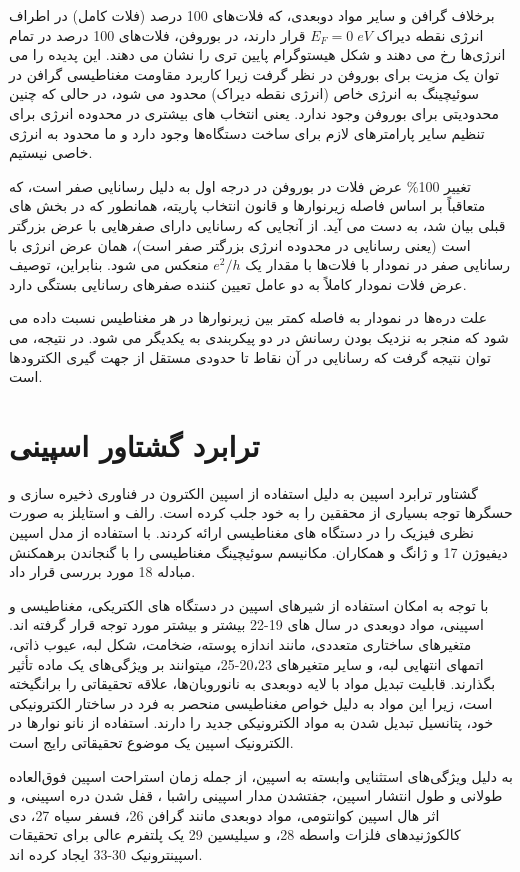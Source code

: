 برخلاف گرافن و سایر مواد دوبعدی، که فلات‌های 100 درصد (فلات کامل) در اطراف انرژی نقطه دیراک $E_F = 0\; eV$ قرار دارند، در بوروفن، فلات‌های 100 درصد در تمام انرژی‌ها رخ می دهند و شکل هیستوگرام پایین تری را نشان می دهند. این پدیده را می توان یک مزیت برای بوروفن در نظر گرفت زیرا کاربرد مقاومت مغناطیسی گرافن در سوئیچینگ به انرژی خاص (انرژی نقطه دیراک) محدود می شود، در حالی که چنین محدودیتی برای بوروفن وجود ندارد. یعنی انتخاب های بیشتری در محدوده انرژی برای تنظیم سایر پارامترهای لازم برای ساخت دستگاه‌ها وجود دارد و ما محدود به انرژی خاصی نیستیم.

تغییر 100\% عرض فلات در بوروفن در درجه اول به دلیل رسانایی  صفر است، که متعاقباً بر اساس فاصله زیر‌نوارها و قانون انتخاب پاریته، همانطور که در بخش های قبلی بیان شد، به دست می آید. از آنجایی که رسانایی دارای صفرهایی با عرض بزرگتر است (یعنی رسانایی در محدوده انرژی بزرگتر صفر است)، همان عرض انرژی با رسانایی صفر در نمودار  با فلات‌ها با مقدار یک $e^2/h$ منعکس می شود. بنابراین، توصیف عرض فلات نمودار  کاملاً به دو عامل تعیین کننده صفرهای رسانایی بستگی دارد. 

علت دره‌ها در نمودار  به فاصله کمتر بین زیر‌نوارها در هر مغناطیس نسبت داده می شود که منجر به نزدیک بودن رسانش در دو پیکربندی به یکدیگر می شود. در نتیجه، می توان نتیجه گرفت که رسانایی در آن نقاط تا حدودی مستقل از جهت گیری الکترودها است.
\section{ترابرد گشتاور اسپینی}
گشتاور ترابرد اسپین  به دلیل استفاده از اسپین الکترون در فناوری ذخیره سازی و حسگرها توجه بسیاری از محققین را به خود جلب کرده است. رالف و استایلز به صورت نظری فیزیک  را در دستگاه های مغناطیسی ارائه کردند.  با استفاده از مدل اسپین دیفیوژن 17 و ژانگ و همکاران. مکانیسم سوئیچینگ مغناطیسی را با گنجاندن برهمکنش مبادله 18 مورد بررسی قرار داد. 

با توجه به امکان استفاده از شیرهای اسپین در دستگاه های الکتریکی، مغناطیسی و اسپینی، مواد دوبعدی  در سال های 19-22 بیشتر و بیشتر مورد توجه قرار گرفته اند. متغیرهای ساختاری متعددی، مانند اندازه پوسته، ضخامت، شکل لبه، عیوب ذاتی، اتمهای انتهایی لبه، و سایر متغیرهای 20،23-25، میتوانند بر ویژگی‌های یک ماده تأثیر بگذارند. قابلیت تبدیل مواد با لایه دوبعدی به نانوروبان‌ها، علاقه تحقیقاتی را برانگیخته است، زیرا این مواد به دلیل خواص مغناطیسی منحصر به فرد در ساختار الکترونیکی خود، پتانسیل تبدیل شدن به مواد الکترونیکی جدید را دارند. استفاده از نانو نوارها در الکترونیک اسپین یک موضوع تحقیقاتی رایج است. 

به دلیل ویژگی‌های استثنایی وابسته به اسپین، از جمله زمان استراحت اسپین فوق‌العاده طولانی و طول انتشار اسپین، جفتشدن مدار اسپینی راشبا ، قفل شدن دره اسپینی، و اثر هال اسپین کوانتومی، مواد دوبعدی مانند گرافن 26، فسفر سیاه  27، دی کالکوژنیدهای فلزات واسطه  28، و سیلیسین 29 یک پلتفرم عالی برای تحقیقات اسپینترونیک 30-33 ایجاد کرده اند.

